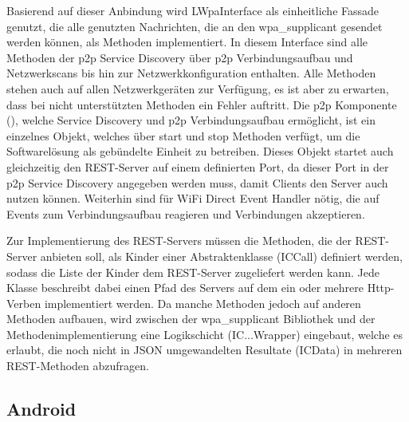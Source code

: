 		Basierend auf dieser Anbindung wird LWpaInterface als einheitliche Fassade genutzt, die alle genutzten Nachrichten, die an den wpa\_supplicant gesendet werden können, als Methoden implementiert.
		In diesem Interface sind alle Methoden der p2p Service Discovery über p2p Verbindungsaufbau und Netzwerkscans bis hin zur Netzwerkkonfiguration enthalten. Alle Methoden stehen auch auf allen Netzwerkgeräten zur Verfügung, es ist aber zu erwarten, dass bei nicht unterstützten Methoden ein Fehler auftritt.
		Die p2p Komponente (), welche Service Discovery und p2p Verbindungsaufbau ermöglicht, ist ein einzelnes Objekt, welches über start und stop Methoden verfügt, um die Softwarelösung als gebündelte Einheit zu betreiben. Dieses Objekt startet auch gleichzeitig den REST-Server auf einem definierten Port, da dieser Port in der p2p Service Discovery angegeben werden muss, damit Clients den Server auch nutzen können. Weiterhin sind für WiFi Direct Event Handler nötig, die auf Events zum Verbindungsaufbau reagieren und Verbindungen akzeptieren.
		
		Zur Implementierung des REST-Servers müssen die Methoden, die der REST-Server anbieten soll, als Kinder einer Abstraktenklasse (ICCall) definiert werden, sodass die Liste der Kinder dem REST-Server zugeliefert werden kann.
		Jede Klasse beschreibt dabei einen Pfad des Servers auf dem ein oder mehrere Http-Verben implementiert werden. Da manche Methoden jedoch auf anderen Methoden aufbauen, wird zwischen der wpa\_supplicant Bibliothek und der Methodenimplementierung eine Logikschicht (IC...Wrapper) eingebaut, welche es erlaubt, die noch nicht in JSON umgewandelten Resultate (ICData) in mehreren REST-Methoden abzufragen.
		
	\subsection{Android}

